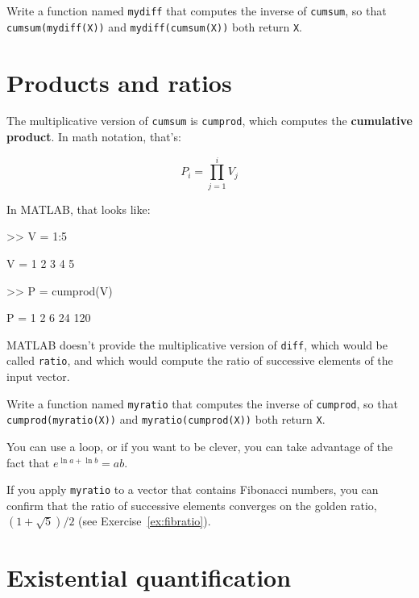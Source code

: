 \documentclass[
]{book}
\numberwithin{Answer}{chapter}
\numberwithin{Exercise}{chapter}
\begin{document}
\begin{ex}
Write a function named {\tt mydiff} that computes the
inverse of {\tt cumsum}, so that {\tt cumsum(mydiff(X))} and
{\tt mydiff(cumsum(X))} both return {\tt X}.

\end{ex}


\section{Products and ratios}

The multiplicative version of {\tt cumsum} is {\tt cumprod},
which computes the {\bf cumulative product}.  In math notation,
that's:


\begin{equation}
P_i = \prod_{j=1}^i V_j
\end{equation}

In MATLAB, that looks like:

\begin{code}
>> V = 1:5

V = 1     2     3     4     5

>> P = cumprod(V)

P = 1     2     6    24   120
\end{code}

MATLAB doesn't provide the multiplicative version
of {\tt diff}, which would be called {\tt ratio}, and which would
compute the ratio of successive elements of the input vector.

\begin{ex}
Write a function named {\tt myratio} that computes the
inverse of {\tt cumprod}, so that {\tt cumprod(myratio(X))} and
{\tt myratio(cumprod(X))} both
return {\tt X}.

You can use a loop, or if you want to be clever, you can take
advantage of the fact that $e^{\ln a + \ln b} = a b$.

If you apply {\tt myratio} to a vector that contains Fibonacci
numbers, you can confirm that the ratio of successive elements
converges on the golden ratio, $(1+\sqrt{5})/2$ (see
Exercise~\ref{ex:fibratio}).

\end{ex}



\section{Existential quantification}
\end{document}

